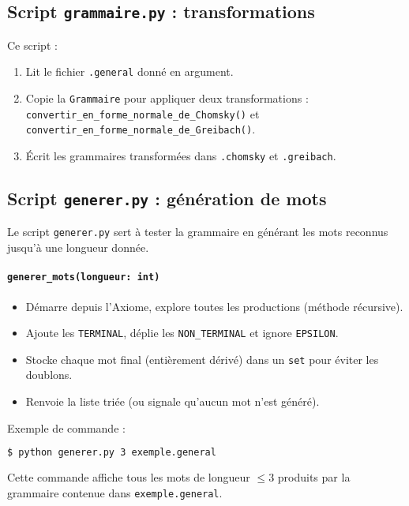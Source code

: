 \documentclass[a4paper,12pt]{article}
\begin{document}
\subsection{Script \texttt{grammaire.py} : transformations}
\label{subsec:grammaire-py}

Ce script :
\begin{enumerate}
    \item Lit le fichier \texttt{.general} donné en argument.
    \item Copie la \texttt{Grammaire} pour appliquer deux transformations : \texttt{convertir\_en\_forme\_normale\_de\_Chomsky()} et \texttt{convertir\_en\_forme\_normale\_de\_Greibach()}.
    \item Écrit les grammaires transformées dans \texttt{.chomsky} et \texttt{.greibach}.
\end{enumerate}

\subsection{Script \texttt{generer.py} : génération de mots}
\label{subsec:generer-py}

Le script \texttt{generer.py} sert à tester la grammaire en générant les mots reconnus jusqu’à une longueur donnée.

\paragraph{\texttt{generer\_mots(longueur: int)}} 
\begin{itemize}
    \item Démarre depuis l’Axiome, explore toutes les productions (méthode récursive).
    \item Ajoute les \texttt{TERMINAL}, déplie les \texttt{NON\_TERMINAL} et ignore \texttt{EPSILON}.
    \item Stocke chaque mot final (entièrement dérivé) dans un \texttt{set} pour éviter les doublons.
    \item Renvoie la liste triée (ou signale qu’aucun mot n’est généré).
\end{itemize}

\noindent
Exemple de commande :
\begin{lstlisting}[language=bash, caption={Exemple d’utilisation de generer.py}, label={lst:exemple-generer}]
$ python generer.py 3 exemple.general
\end{lstlisting}
Cette commande affiche tous les mots de longueur \(\leq 3\) produits par la grammaire contenue dans \texttt{exemple.general}.
\end{document}
